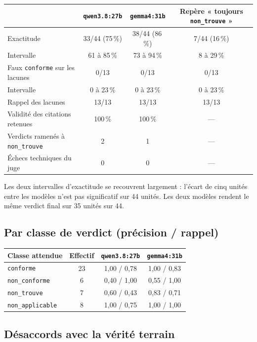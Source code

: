 \documentclass[11pt,a4paper]{article}
\begin{document}
\begin{center}
\begin{tabular}{@{}lccc@{}}
\toprule
 & \texttt{qwen3.8:27b} & \texttt{gemma4:31b} & Repère « toujours \texttt{non\_trouve} » \\
\midrule
Exactitude & 33/44 (75\,\%) & 38/44 (86\,\%) & 7/44 (16\,\%) \\
Intervalle & 61 à 85\,\% & 73 à 94\,\% & 8 à 29\,\% \\
Faux \texttt{conforme} sur les lacunes & 0/13 & 0/13 & 0/13 \\
Intervalle & 0 à 23\,\% & 0 à 23\,\% & 0 à 23\,\% \\
Rappel des lacunes & 13/13 & 13/13 & 13/13 \\
Validité des citations retenues & 100\,\% & 100\,\% & --- \\
Verdicts ramenés à \texttt{non\_trouve} & 2 & 1 & --- \\
Échecs techniques du juge & 0 & 0 & --- \\
\bottomrule
\end{tabular}
\end{center}

Les deux intervalles d'exactitude se recouvrent largement : l'écart de
cinq unités entre les modèles n'est pas significatif sur 44 unités. Les deux
modèles rendent le même verdict final sur 35 unités sur 44.

\subsection*{Par classe de verdict (précision / rappel)}

\begin{center}
\begin{tabular}{@{}lccc@{}}
\toprule
Classe attendue & Effectif & \texttt{qwen3.8:27b} & \texttt{gemma4:31b} \\
\midrule
\texttt{conforme} & 23 & 1,00 / 0,78 & 1,00 / 0,83 \\
\texttt{non\_conforme} & 6 & 0,40 / 1,00 & 0,55 / 1,00 \\
\texttt{non\_trouve} & 7 & 0,60 / 0,43 & 0,83 / 0,71 \\
\texttt{non\_applicable} & 8 & 1,00 / 0,75 & 1,00 / 1,00 \\
\bottomrule
\end{tabular}
\end{center}

\subsection*{Désaccords avec la vérité terrain}
\end{document}

